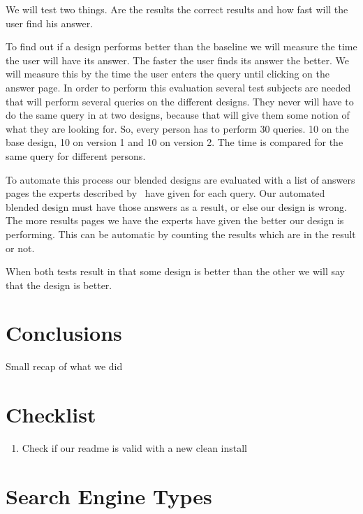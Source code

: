 \documentclass[12pt]{article}
\begin{document}
We will test two things. Are the results the correct results and how fast will the user find his answer. 

To find out if a design performs better than the baseline we will measure the time the user will have its answer. The faster the user finds its answer the better. We will measure this by the time the user enters the query until clicking on the answer page. In order to perform this evaluation several test subjects are needed that will perform several queries on the different designs. They never will have to do the same query in at two designs, because that will give them some notion of what they are looking for. So, every person has to perform 30 queries. 10 on the base design, 10 on version 1 and 10 on version 2. The time is compared for the same query for different persons.

To automate this process our blended designs are evaluated with a list of answers pages the experts described by~\cite{lalmas2011aggregated} have given for each query. Our automated blended design must have those answers as a result, or else our design is wrong. The more results pages we have the experts have given the better our design is performing. This can be automatic by counting the results which are in the result or not. 

When both tests result in that some design is better than the other we will say that the design is better. %

\section{Conclusions}
\label{sec:conclusion}
Small recap of what we did

\section{Checklist}
\begin{enumerate}
\item Check if our readme is valid with a new clean install
\end{enumerate}




\appendix
\section{Search Engine Types}
\label{app:enginetypes}

\end{document}
